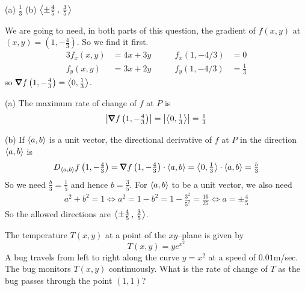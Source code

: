 \begin{answer}
(a) $\frac{1}{3}$\qquad
(b) $\left< \pm\frac{4}{5}\,,\,\frac{3}{5}\right>$
\end{answer}

\begin{solution}
We are going to need, in both parts of this question,
the gradient of $f(x,y)$ at $(x,y)=\left(1, -\frac{4}{3}\right)$.
So we find it first.
\begin{alignat*}{3}
f_x(x,y)&=4x+3y\qquad &
f_x(1,-4/3)&=0
\\
f_y(x,y)&=3x+2y\qquad &
f_y(1,-4/3)&=\frac{1}{3}
\end{alignat*}
so $\vnabla f\left(1, -\frac{4}{3}\right) =\llt 0,\frac{1}{3}\rgt$.

(a) The maximum rate of change of $f$ at $P$ is
\begin{align*}
\left|\vnabla f\left(1, -\tfrac{4}{3}\right)\right| 
=\left|\llt 0,\tfrac{1}{3}\rgt\right|
=\tfrac{1}{3}
\end{align*}

(b) If $\left< a,b\right>$ is a unit vector, the directional derivative of $f$
at $P$ in the direction $\left< a,b\right>$ is
\begin{align*}
D_{\llt a,b\rgt}f\left(1, -\tfrac{4}{3}\right)
=\vnabla f\left(1, -\tfrac{4}{3}\right)\cdot \llt a,b\rgt
=\llt 0,\tfrac{1}{3}\rgt\cdot \llt a,b\rgt
=\tfrac{b}{3}
\end{align*}
So we need $\frac{b}{3}=\frac{1}{5}$ and hence $b=\frac{3}{5}$.
For $\left< a,b\right>$ to be a unit vector, we also need
\begin{align*}
a^2+b^2=1
\iff
a^2=1-b^2=1-\frac{3^2}{5^2}=\frac{16}{25}
\iff
a=\pm\frac{4}{5}
\end{align*}
So the allowed directions are $\left< \pm\frac{4}{5}\,,\,\frac{3}{5}\right>$.
\end{solution}

\begin{question}[M200 2010A] %
The temperature $T(x, y)$ at a point of the $xy$--plane is given by
\begin{equation*}
T(x, y) = ye^{x^2} 
\end{equation*}
A bug travels from left to right along the curve $y = x^2$ at a speed of $0.01$m/sec. The bug
monitors $T(x, y)$ continuously. What is the rate of change of $T$ as the bug passes through
the point $(1, 1)$?
\end{question}

%

